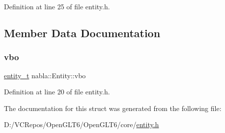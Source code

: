 Definition at line 25 of file entity.\+h.



\subsection{Member Data Documentation}
\mbox{\label{structnabla_1_1_entity_ab7db36f74338d506d40f7f17e3308b29}} 
\subsubsection{\texorpdfstring{vbo}{vbo}}
{\footnotesize\ttfamily \mbox{\hyperlink{structnabla_1_1_entity_a0e7d5826cda759dfeb3a81c8175f3b4d}{entity\+\_\+t}} nabla\+::\+Entity\+::vbo}



Definition at line 20 of file entity.\+h.



The documentation for this struct was generated from the following file\+:\begin{DoxyCompactItemize}
\item 
D\+:/\+V\+C\+Repos/\+Open\+G\+L\+T6/\+Open\+G\+L\+T6/core/\mbox{\hyperlink{entity_8h}{entity.\+h}}\end{DoxyCompactItemize}
